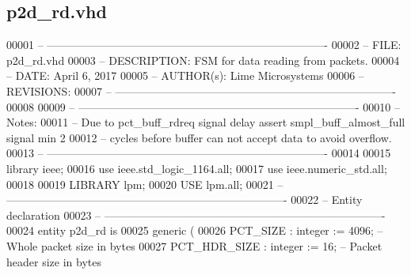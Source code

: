 \subsection{p2d\+\_\+rd.\+vhd}
\label{p2d__rd_8vhd_source}

\begin{DoxyCode}
00001 \textcolor{keyword}{-- ---------------------------------------------------------------------------- }
00002 \textcolor{keyword}{-- FILE:          p2d\_rd.vhd}
00003 \textcolor{keyword}{-- DESCRIPTION:   FSM for data reading from packets.}
00004 \textcolor{keyword}{-- DATE:          April 6, 2017}
00005 \textcolor{keyword}{-- AUTHOR(s):     Lime Microsystems}
00006 \textcolor{keyword}{-- REVISIONS:}
00007 \textcolor{keyword}{-- ---------------------------------------------------------------------------- }
00008 
00009 \textcolor{keyword}{-- ----------------------------------------------------------------------------}
00010 \textcolor{keyword}{-- Notes:}
00011 \textcolor{keyword}{-- Due to pct\_buff\_rdreq signal delay assert smpl\_buff\_almost\_full signal min 2}
00012 \textcolor{keyword}{-- cycles before buffer can not accept data to avoid overflow.}
00013 \textcolor{keyword}{-- ----------------------------------------------------------------------------}
00014 
00015 \textcolor{vhdlkeyword}{library }\textcolor{keywordflow}{ieee};
00016 \textcolor{vhdlkeyword}{use }ieee.std\_logic\_1164.\textcolor{keywordflow}{all};
00017 \textcolor{vhdlkeyword}{use }ieee.numeric\_std.\textcolor{keywordflow}{all};
00018 
00019 \textcolor{vhdlkeyword}{LIBRARY }\textcolor{keywordflow}{lpm};
00020 \textcolor{vhdlkeyword}{USE }\textcolor{keywordflow}{lpm.all};
00021 \textcolor{keyword}{-- ----------------------------------------------------------------------------}
00022 \textcolor{keyword}{-- Entity declaration}
00023 \textcolor{keyword}{-- ----------------------------------------------------------------------------}
00024 \textcolor{keywordflow}{entity }p2d_rd \textcolor{keywordflow}{is}
00025    \textcolor{keywordflow}{generic} \textcolor{vhdlchar}{(}
00026       \textcolor{vhdlchar}{PCT_SIZE}             \textcolor{vhdlchar}{:} \textcolor{comment}{integer} \textcolor{vhdlchar}{:=} \textcolor{vhdllogic}{}\textcolor{vhdllogic}{4096};\textcolor{keyword}{   -- Whole packet size in bytes}
00027       \textcolor{vhdlchar}{PCT_HDR_SIZE}         \textcolor{vhdlchar}{:} \textcolor{comment}{integer} \textcolor{vhdlchar}{:=} \textcolor{vhdllogic}{}\textcolor{vhdllogic}{16};\textcolor{keyword}{     -- Packet header size in bytes  }

\end{DoxyCode}
